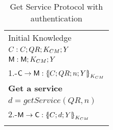 \begin{table}[htb]
\footnotesize
\begin{center}
\caption{Get Service Protocol with authentication}
\label{table:ProtGetServicesAuth}
\begin{tabular}{|l|}
\hline
           Initial Knowledge                                                             \\
            $C:C; QR ;  K_{CM} ; Y$                                    \\
            $\textsf{M}: \textsf{M}; K_{CM} ; Y$    \\ \hline \hline 
           1.-$\Client\rightarrow \Server: \fat{C \lnk QR \lnk n \lnk Y}_{K_{\client\serverW}}$          \\ 
           \textbf{Get a service}                                                                        \\
           \hspace{5mm} $d=getService(QR,n)$                                  \\  
           2.-$\Server\rightarrow \Client: \fat{C \lnk d \lnk Y}_{K_{\client\serverW}}$       \\ \\   \hline \hline
\end{tabular}
\end{center}
\end{table}
\normalsize


